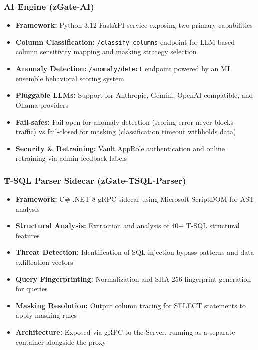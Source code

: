 \subsubsection{AI Engine (zGate-AI)}
\begin{itemize}
    \item \textbf{Framework:} Python 3.12 FastAPI service exposing two primary capabilities
    \item \textbf{Column Classification:} \texttt{/classify-columns} endpoint for LLM-based column sensitivity mapping and masking strategy selection
    \item \textbf{Anomaly Detection:} \texttt{/anomaly/detect} endpoint powered by an ML ensemble behavioral scoring system
    \item \textbf{Pluggable LLMs:} Support for Anthropic, Gemini, OpenAI-compatible, and Ollama providers
    \item \textbf{Fail-safes:} Fail-open for anomaly detection (scoring error never blocks traffic) vs fail-closed for masking (classification timeout withholds data)
    \item \textbf{Security \& Retraining:} Vault AppRole authentication and online retraining via admin feedback labels
\end{itemize}

\subsubsection{T-SQL Parser Sidecar (zGate-TSQL-Parser)}
\begin{itemize}
    \item \textbf{Framework:} C\# .NET 8 gRPC sidecar using Microsoft ScriptDOM for AST analysis
    \item \textbf{Structural Analysis:} Extraction and analysis of 40+ T-SQL structural features
    \item \textbf{Threat Detection:} Identification of SQL injection bypass patterns and data exfiltration vectors
    \item \textbf{Query Fingerprinting:} Normalization and SHA-256 fingerprint generation for queries
    \item \textbf{Masking Resolution:} Output column tracing for SELECT statements to apply masking rules
    \item \textbf{Architecture:} Exposed via gRPC to the Server, running as a separate container alongside the proxy
\end{itemize}

